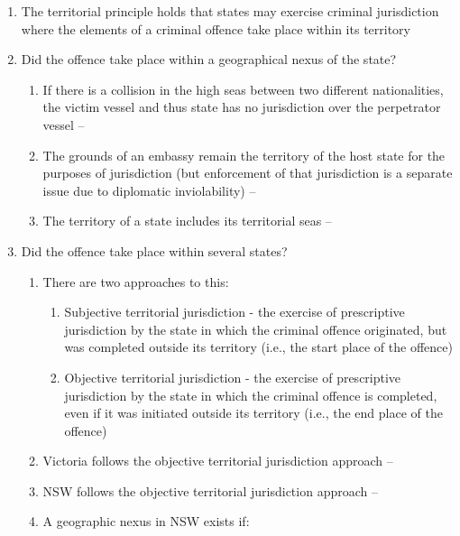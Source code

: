 \begin{enumerate}
    \begin{enumerate}
        \item The territorial principle holds that states may exercise criminal jurisdiction where the elements of a criminal offence take place within its territory
        \item Did the offence take place within a geographical nexus of the state?
        \begin{enumerate}
            \item If there is a collision in the high seas between two different nationalities, the victim vessel and thus state has no jurisdiction over the perpetrator vessel -- 
            \item The grounds of an embassy remain the territory of the host state for the purposes of jurisdiction (but enforcement of that jurisdiction is a separate issue due to diplomatic inviolability) -- 
            \item The territory of a state includes its territorial seas -- 
        \end{enumerate}
        \item Did the offence take place within several states?
        \begin{enumerate}
            \item There are two approaches to this:
            \begin{enumerate}
                \item Subjective territorial jurisdiction - the exercise of prescriptive jurisdiction by the state in which the criminal offence originated, but was completed outside its territory (i.e., the start place of the offence)
                \item Objective territorial jurisdiction - the exercise of prescriptive jurisdiction by the state in which the criminal offence is completed, even if it was initiated outside its territory (i.e., the end place of the offence)
            \end{enumerate}
            \item Victoria follows the objective territorial jurisdiction approach -- 
            \item NSW follows the objective territorial jurisdiction approach -- 
            \item A geographic nexus in NSW exists if:

\end{enumerate}
\end{enumerate}
\end{enumerate}
